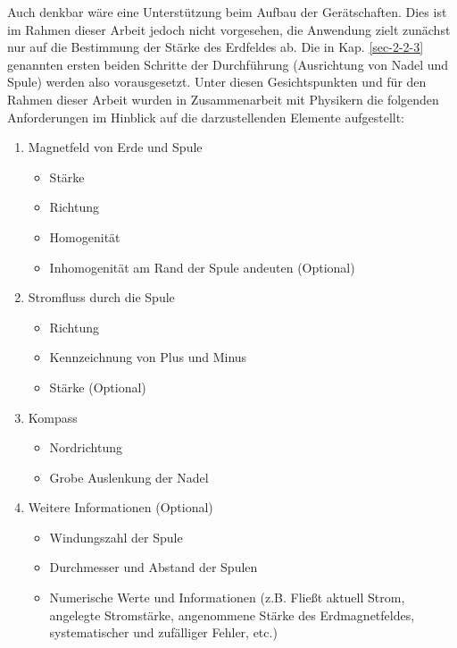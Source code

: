 Auch denkbar wäre eine Unterstützung beim Aufbau der Gerätschaften. Dies ist im Rahmen dieser Arbeit jedoch nicht vorgesehen, die Anwendung zielt zunächst nur auf die Bestimmung der Stärke des Erdfeldes ab. Die in Kap. \ref{sec-2-2-3} genannten ersten beiden Schritte der Durchführung (Ausrichtung von Nadel und Spule) werden also vorausgesetzt. Unter diesen Gesichtspunkten und für den Rahmen dieser Arbeit wurden in Zusammenarbeit mit Physikern die folgenden Anforderungen im Hinblick auf die darzustellenden Elemente aufgestellt:\\[4px]
\begin{enumerate}[topsep=-2px]
	\setlength{\itemsep}{-5pt}
	\item Magnetfeld von Erde und Spule
	\begin{itemize}[topsep=-0.25em]
		\setlength{\itemsep}{-0.25em}
		\item Stärke
		\item Richtung
		\item Homogenität
		\item Inhomogenität am Rand der Spule andeuten (Optional) 
	\end{itemize}
	\item Stromfluss durch die Spule
	\begin{itemize}[topsep=-0.25em]
		\setlength{\itemsep}{-0.25em}
		\item Richtung
		\item Kennzeichnung von Plus und Minus
		\item Stärke (Optional) 
	\end{itemize}
	\item Kompass
	\begin{itemize}[topsep=-0.25em]
		\setlength{\itemsep}{-0.25em}
		\item Nordrichtung
		\item Grobe Auslenkung der Nadel
	\end{itemize}
	\item Weitere Informationen (Optional)
	\begin{itemize}[topsep=-0.25em]
		\singlespacing
		\item Windungszahl der Spule
		\item Durchmesser und Abstand der Spulen
		\item Numerische Werte und Informationen (z.B. Fließt aktuell Strom, angelegte Stromstärke, angenommene Stärke des Erdmagnetfeldes, systematischer und zufälliger Fehler, etc.)
	\end{itemize}
\end{enumerate}
\vspace{6px}


